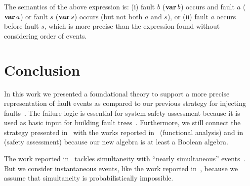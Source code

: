 \documentclass[en,twoside,onehalfspacing,phd]{risethesis}
\newcommand{\simulink}{Simulink\xspace}
\def\varop{\ensuremath\operatorname{\mathbf{var}}}
\newcommand{\var}[1]{\ensuremath\varop #1}
\begin{document}
The semantics of the above expression is: (i) fault $b$ ($\var{b}$) occurs and fault $a$ ($\var{a}$) or fault $s$ ($\var{s}$) occurs (but not both $a$ and $s$), or (ii) fault $a$ occurs before fault $s$, which is more precise than the expression found without considering order of events.

\chapter{Conclusion}
\label{sec:conclusion}

In this work we presented a foundational theory to support a more precise representation of fault events as compared to our previous strategy for injecting faults~\cite{DM2012}.
%
The failure logic is essential for system safety assessment because it is used as basic input for building fault trees~\cite{PMS+2001,JMS+2011,GMS+2010}.
%
%
Furthermore, we still connect the strategy presented in~\cite{MJG+2010} with the works reported in~\cite{JMS+2011} (functional analysis) and in~\cite{GMS+2010,PMS+2001} (safety assessment) because our new algebra is at least a Boolean algebra.


%
%

\begin{sloppypar}
The work reported in~\cite{Walker2009,WP2009,WP2010} tackles simultaneity with ``nearly simultaneous'' events~\cite{EWG2013}.
But we consider instantaneous events, like the work reported in~\cite{MRL2014}, because we assume that simultaneity is probabilistically impossible.
\end{sloppypar}

%
%
%
%
\end{document}
